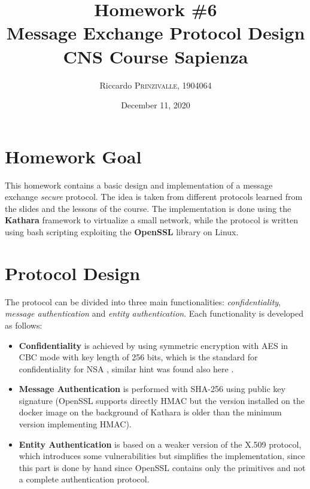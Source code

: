 \documentclass{article}
\title{Homework \#6 \\Message Exchange Protocol Design \\[0.2em]\small{}CNS Course Sapienza} %
\author{Riccardo \textsc{Prinzivalle}, 1904064} %
\date{December 11, 2020} %
\begin{document}
\maketitle %


\section{Homework Goal}

This homework contains a basic design and implementation of a message exchange \textit{secure} protocol. The idea is taken from different protocols learned from the slides and the lessons of the course. The implementation is done using the \textbf{Kathara} framework to virtualize a small network, while the protocol is written using bash scripting exploiting the \textbf{OpenSSL} library on Linux.


\section{Protocol Design}

The protocol can be divided into three main functionalities: \textit{confidentiality}, \textit{message authentication} and \textit{entity authentication}. Each functionality is developed as follows:

\begin{itemize}
	\item \textbf{Confidentiality} is achieved by using symmetric encryption with AES in CBC mode with key length of 256 bits, which is the standard for confidentiality for NSA \cite{AES_NSA}, similar hint was found also here \cite{AES_stack}.
	\item \textbf{Message Authentication} is performed with SHA-256 using public key signature (OpenSSL supports directly HMAC but the version installed on the docker image on the background of Kathara is older than the minimum version implementing HMAC).
	\item \textbf{Entity Authentication} is based on a weaker version of the X.509 protocol, which introduces some vulnerabilities but simplifies the implementation, since this part is done by hand since OpenSSL contains only the primitives and not a complete authentication protocol. 
\end{itemize}
\end{document}
